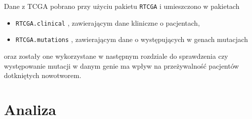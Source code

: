 Dane z TCGA pobrano przy użyciu pakietu \texttt{RTCGA} \cite{kosa1} i umieszczono w pakietach
\begin{itemize}
\item \texttt{RTCGA.clinical} \cite{kosa2}, zawierającym dane kliniczne o pacjentach,
\item \texttt{RTCGA.mutations} \cite{kosa3}, zawierającym dane o występujących w genach mutacjach
\end{itemize} 
oraz zostały one wykorzystane w następnym rozdziale do sprawdzenia czy występowanie mutacji w danym genie ma wpływ na przeżywalność pacjentów dotkniętych nowotworem.



\section{Analiza}